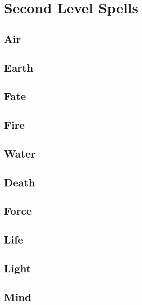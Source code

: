 \section{Second Level Spells}

\begin{multicols}{2}

\subsection{Air}


\subsection{Earth}


\subsection{Fate}


\subsection{Fire}


\subsection{Water}


\subsection{Death}


\subsection{Force}


\subsection{Life}


\subsection{Light}


\subsection{Mind}


\end{multicols}

